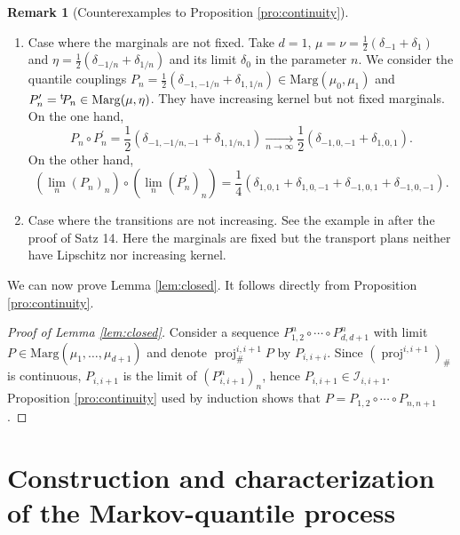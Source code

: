 \documentclass[JEP,XML,SOM,Unicode,NoEqCountersInSection,NoFloatCountersInSection,published]{cedram}
\theoremstyle{plain}
\theoremstyle{definition}
\newtheorem{rem}[them]{Remark}
\newcommand{\trans}{{}^{\mathrm{t}}\mkern-1mu}
\newcommand{\ma}{\mathrm{Marg}}
\newcommand{\pr}{\operatorname{proj}}
\begin{document}
\skpt
\begin{rem}[Counterexamples to Proposition \ref{pro:continuity}]
\begin{enumerate}
\item
Case where the mar\-gin\-als are not fixed. Take $d=1$, $\mu=\nu=\frac{1}{2}(\delta_{-1}+\delta_1)$ and $\eta=\frac{1}{2}(\delta_{-1/n}+\delta_{1/n})$ and its limit $\delta_0$ in the parameter $n$. We consider the quantile couplings $P_n=\frac{1}{2}(\delta_{-1,-1/n}+\delta_{1,1/n})\in\ma(\mu_0,\mu_1)$ and $P^{\prime}_n=\trans\!P_n\in\ma(\mu,\eta)$. They have increasing kernel but not fixed marginals. On the one hand,
\[
P_n\circ P^{\prime}_n=\frac{1}{2}(\delta_{-1,-1/n,-1}+\delta_{1,1/n,1})\underset{n\to\infty}{\longrightarrow}\frac{1}{2}(\delta_{-1,0,-1}+\delta_{1,0,1}).
\]
On the other hand,
\[
(\lim_n(P_n)_{n})\circ(\lim_n(P^{\prime}_n)_{n})=\frac{1}{4}(\delta_{1,0,1}+\delta_{1,0,-1}+\delta_{-1,0,1}+\delta_{-1,0,-1}).
\]

\item
Case where the transitions are not increasing. See the example in \cite{Ke72} after the proof of Satz 14. Here the marginals are fixed but the transport plans neither have Lipschitz nor increasing kernel.
\end{enumerate}
\end{rem}

We can now prove Lemma \ref{lem:closed}. It follows directly from Proposition \ref{pro:continuity}.

\begin{proof}[Proof of Lemma \ref{lem:closed}]\label{proof:lem:closed}
Consider a sequence $P^n_{1,2}\circ\cdots\circ P^n_{d,d+1}$ with limit $P\in\ma(\mu_1,\ldots,\mu_{d+1})$ and denote $\pr^{i,i+1}_{\#}P$ by $P_{i,i+i}$. Since $(\pr^{i,i+1})_\#$ is continuous, $P_{i,i+1}$ is the limit of $(P_{i,i+1}^n)_n$, hence $P_{i,i+1}\in\mathcal{I}_{i,i+1}$. Proposition \ref{pro:continuity} used by induction shows that $P=P_{1,2}\circ\cdots\circ P_{n,n+1}$.
\end{proof}

\section{Construction and characterization of the Markov-quantile process}\label{sec:construction}
\end{document}
